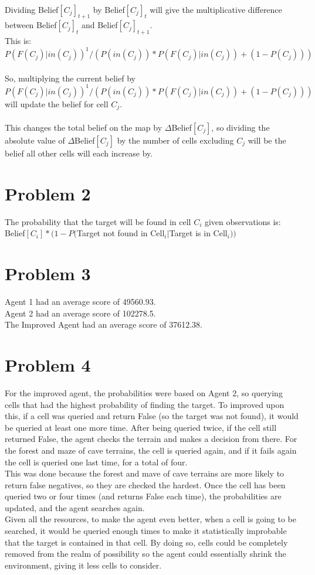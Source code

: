 \documentclass[12pt]{report}
\begin{document}
\\
Dividing Belief$[C_{j}]_{t+1}$ by Belief$[C_{j}]_{t}$ will give the multiplicative difference between Belief$[C_{j}]_{t}$ and Belief$[C_{j}]_{t+1}$.\\
This is: $P(F(C_{j})|in(C_{j}))^{1}/(P(in(C_{j}))*P(F(C_{j})|in(C_{j}))+(1-P(C_{j})))$\\
\\
So, multiplying the current belief by $P(F(C_{j})|in(C_{j}))^{1}/(P(in(C_{j}))*P(F(C_{j})|in(C_{j}))+(1-P(C_{j})))$ will update the belief for cell $C_{j}$.\\
\\
This changes the total belief on the map by $\Delta$Belief$[C_{j}]$, so dividing the absolute value of $\Delta$Belief$[C_{j}]$ by the number of cells excluding $C_{j}$ will be the belief all other cells will each increase by.

\section{Problem 2}
The probability that the target will be found in cell $C_{i}$ given observations is:\\
Belief$[C_{i}]*(1-P($Target not found in Cell$_{i}|$Target is in Cell$_{i}))$

\section{Problem 3}
Agent 1 had an average score of 49560.93.\\
Agent 2 had an average score of 102278.5.\\
The Improved Agent had an average score of 37612.38.

\section{Problem 4}
For the improved agent, the probabilities were based on Agent 2, so querying cells that had the highest probability of finding the target. To improved upon this, if a cell was queried and return False (so the target was not found), it would be queried at least one more time. After being queried twice, if the cell still returned False, the agent checks the terrain and makes a decision from there. For the forest and maze of cave terrains, the cell is queried again, and if it fails again the cell is queried one last time, for a total of four. \\
This was done because the forest and mave of cave terrains are more likely to return false negatives, so they are checked the hardest. Once the cell has been queried two or four times (and returns False each time), the probabilities are updated, and the agent searches again. \\
Given all the resources, to make the agent even better, when a cell is going to be searched, it would be queried enough times to make it statistically improbable that the target is contained in that cell. By doing so, cells could be completely removed from the realm of possibility so the agent could essentially shrink the environment, giving it less cells to consider.
\end{document}
